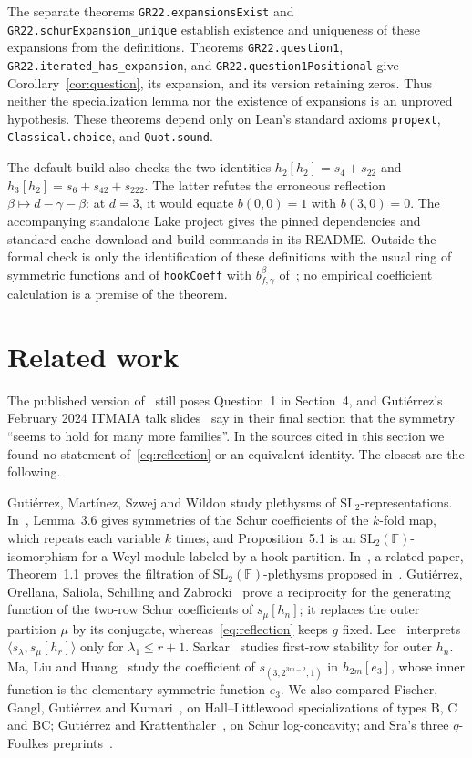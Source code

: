 \documentclass[11pt]{article}
\begin{document}
The separate theorems \texttt{GR22.expansionsExist} and \texttt{GR22.schurExpansion\_unique} establish existence and uniqueness of these expansions from the definitions. Theorems \texttt{GR22.question1}, \texttt{GR22.iterated\_has\_expansion}, and \texttt{GR22.question1Positional} give Corollary~\ref{cor:question}, its expansion, and its version retaining zeros. Thus neither the specialization lemma nor the existence of expansions is an unproved hypothesis. These theorems depend only on Lean's standard axioms \texttt{propext}, \texttt{Classical.choice}, and \texttt{Quot.sound}.

The default build also checks the two identities $h_2[h_2]=s_4+s_{22}$ and $h_3[h_2]=s_6+s_{42}+s_{222}$. The latter refutes the erroneous reflection $\beta\mapsto d-\gamma-\beta$: at $d=3$, it would equate $b(0,0)=1$ with $b(3,0)=0$. The accompanying standalone Lake project gives the pinned dependencies and standard cache-download and build commands in its README. Outside the formal check is only the identification of these definitions with the usual ring of symmetric functions and of \texttt{hookCoeff} with $b^{\beta}_{f,\gamma}$ of~\cite[Definition 2.8]{GR}; no empirical coefficient calculation is a premise of the theorem.

\section{Related work}
The published version of~\cite{GR} still poses Question~1 in Section~4, and Gutiérrez's February 2024 ITMAIA talk slides~\cite{itmaia} say in their final section that the symmetry ``seems to hold for many more families''. In the sources cited in this section we found no statement of~\eqref{eq:reflection} or an equivalent identity. The closest are the following.

Gutiérrez, Martínez, Szwej and Wildon study plethysms of $\mathrm{SL}_2$-representations. In~\cite{lifts}, Lemma~3.6 gives symmetries of the Schur coefficients of the $k$-fold map, which repeats each variable $k$ times, and Proposition~5.1 is an $\mathrm{SL}_2(\mathbb{F})$-isomorphism for a Weyl module labeled by a hook partition. In~\cite{filtration}, a related paper, Theorem~1.1 proves the filtration of $\mathrm{SL}_2(\mathbb{F})$-plethysms proposed in~\cite[Conjecture~6.1]{lifts}. Gutiérrez, Orellana, Saliola, Schilling and Zabrocki~\cite[Theorem~5.10]{geometric} prove a reciprocity for the generating function of the two-row Schur coefficients of $s_\mu[h_n]$; it replaces the outer partition $\mu$ by its conjugate, whereas~\eqref{eq:reflection} keeps $g$ fixed. Lee~\cite[Theorem~1.1]{lee} interprets $\langle s_\lambda,s_\mu[h_r]\rangle$ only for $\lambda_1\leq r+1$. Sarkar~\cite[Theorem~6.4 and Corollary~7.2]{sarkar} studies first-row stability for outer $h_n$. Ma, Liu and Huang~\cite[Theorem~1.1]{mlh} study the coefficient of $s_{(3,2^{3m-2},1)}$ in $h_{2m}[e_3]$, whose inner function is the elementary symmetric function $e_3$. We also compared Fischer, Gangl, Gutiérrez and Kumari~\cite{fggk}, on Hall--Littlewood specializations of types $\mathrm{B}$, $\mathrm{C}$ and $\mathrm{BC}$; Gutiérrez and Krattenthaler~\cite{gk}, on Schur log-concavity; and Sra's three $q$-Foulkes preprints~\cite{sra}.
\end{document}

